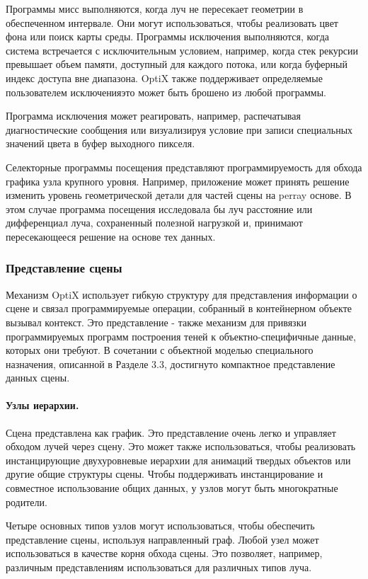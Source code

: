   Программы мисс выполняются, когда луч не пересекает геометрии в обеспеченном интервале. Они могут использоваться, чтобы реализовать цвет фона или поиск карты среды. Программы исключения выполняются, когда система встречается с исключительным условием, например, когда стек рекурсии превышает объем памяти, доступный для каждого потока, или когда буферный индекс доступа вне диапазона. OptiX также поддерживает определяемые пользователем исключенияэто может быть брошено из любой программы. 
  
  Программа исключения может реагировать, например, распечатывая диагностические сообщения или визуализируя условие при записи специальных значений цвета в буфер выходного пикселя. 

Селекторные программы посещения представляют программируемость для обхода графика узла крупного уровня. Например, приложение может принять решение изменить уровень геометрической детали для частей сцены на perray основе. В этом случае программа посещения исследовала бы луч
расстояние или дифференциал луча, сохраненный полезной нагрузкой и, принимают пересекающееся решение на основе тех данных.
\subsubsection{Представление сцены}
Механизм OptiX использует гибкую структуру для представления информации о сцене и связал программируемые операции, собранный в контейнерном объекте вызывал контекст. Это представление - также механизм для привязки программируемых программ построения теней к объектно-специфичные данные, которых они требуют. В сочетании с объектной моделью специального назначения, описанной в Разделе 3.3, достигнуто компактное представление данных сцены.
\paragraph{Узлы иерархии.}

Сцена представлена как график. Это представление очень легко и управляет обходом лучей через сцену. Это может также использоваться, чтобы реализовать инстанцирующие двухуровневые иерархии для анимаций твердых объектов или другие общие структуры сцены. Чтобы поддерживать инстанцирование и совместное использование общих данных, у узлов могут быть многократные родители.

Четыре основных типов узлов могут использоваться, чтобы обеспечить представление сцены, используя направленный граф. Любой узел может использоваться в качестве корня обхода сцены. Это позволяет, например, различным представлениям использоваться для различных типов луча. 

